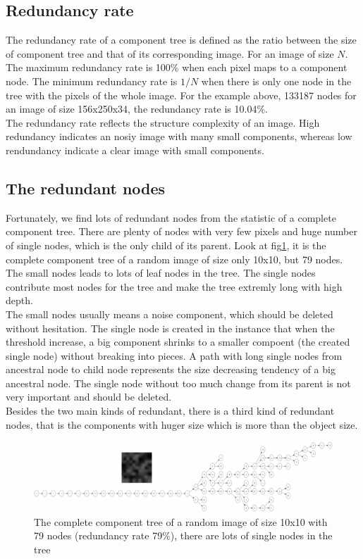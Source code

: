 \subsection{Redundancy rate}
The redundancy rate of a component tree is defined as the ratio between the size of component tree and that of its corresponding image. For an image of size $N$. The maximum redundancy rate is 100\% when each pixel maps to a component node. The minimum redundancy rate is $1/N$ when there is only one node in the tree with the pixels of the whole image. For the example above, 133187 nodes for an image of size 156x250x34, the redundancy rate is 10.04\%.\\
The redundancy rate reflects the structure complexity of an image. High redundancy indicates an nosiy image with many small components, whereas low rendundancy indicate a clear image with small components. 
\subsection{The redundant nodes}
Fortunately, we find lots of redundant nodes from the statistic of a complete component tree. There are plenty of nodes with very few pixels and huge number of single nodes, which is the only child of its parent. Look at fig\ref{fig:cptree-random}, it is the complete component tree of a random image of size only 10x10, but 79 nodes. The small nodes leads to lots of leaf nodes in the tree. The single nodes contribute most nodes for the tree and make the tree extremly long with high depth. \\
The small nodes usually means a noise component, which should be deleted without hesitation. The single node is created in the instance that when the threshold increase, a big component shrinks to a smaller compoent (the created single node) without breaking into pieces. A path with long single nodes from ancestral node to child node represents the size decreasing tendency of a big ancestral node. The single node without too much change from its parent is not very important and should be deleted.\\
Besides the two main kinds of redundant, there is a third kind of redundant nodes, that is the components with huger size which is more than the object size. 
\begin{figure}[htbp]
\centering
\includegraphics[width=1.0\textwidth]{images/cptree_random}
\caption{The complete component tree of a random image of size 10x10 with 79 nodes (redundancy rate 79\%), there are lots of single nodes in the tree}
\label{fig:cptree-random}
\end{figure}

